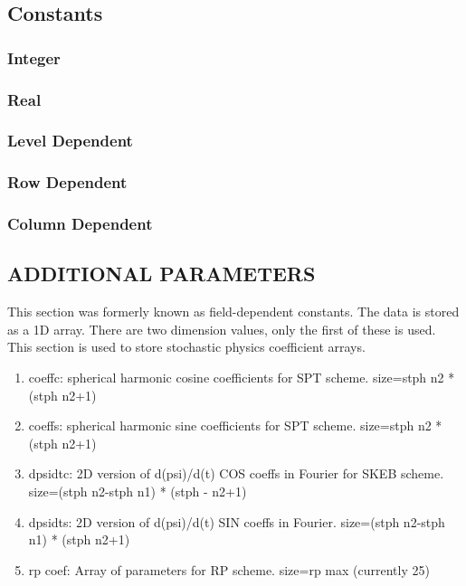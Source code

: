 \subsection{Constants} 


\subsubsection{Integer}
\subsubsection{Real}
\subsubsection{Level Dependent}
\subsubsection{Row Dependent}
\subsubsection{Column Dependent}


\subsection{ADDITIONAL PARAMETERS}


This section was formerly known as field-dependent constants.
The data is stored as a 1D array. There are two dimension values, only the first of these is used. This section is used to store stochastic physics coefficient arrays.


\begin{enumerate}
\item coeffc: spherical harmonic cosine coefficients for SPT scheme. size=stph n2 * (stph n2+1)
\item coeffs: spherical harmonic sine coefficients for SPT scheme. size=stph n2 * (stph n2+1)
\item dpsidtc: 2D version of d(psi)/d(t) COS coeffs in Fourier for SKEB scheme. size=(stph n2-stph n1) * (stph - n2+1)
\item dpsidts: 2D version of d(psi)/d(t) SIN coeffs in Fourier. size=(stph n2-stph n1) * (stph n2+1)
\item rp coef: Array of parameters for RP scheme. size=rp max (currently 25)
\end{enumerate}